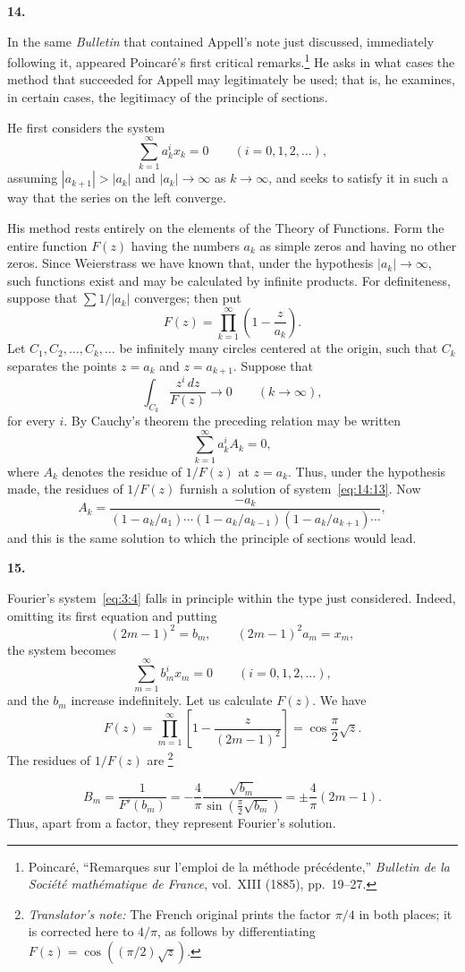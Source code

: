 \documentclass[
  paper=b5,
  fontsize=13pt,
  twoside=true,
  open=any,
  bookmarkpackage=false,
  chapterprefix=true,
  headings=normal
]{scrbook}
\theoremstyle{definition}
\newcommand{\numberedparagraph}[1]{%
  \par\medskip\phantomsection\label{sec:#1}%
  \noindent\textbf{#1.}\enspace
}
\newcounter{translatornote}
\newcommand{\translatornotelabel}{T\arabic{translatornote}}
\newcommand{\translatornote}[1]{%
  \stepcounter{translatornote}%
  \begingroup
    \edef\savedfootnotenumber{\number\value{footnote}}%
    \renewcommand{\thefootnote}{\translatornotelabel}%
    \footnote{\emph{Translator's note:} #1}%
    \setcounter{footnote}{\savedfootnotenumber}%
  \endgroup
}
\begin{document}
\numberedparagraph{14}
In the same \emph{Bulletin} that contained Appell's note just discussed, immediately following it, appeared Poincar\'e's first critical remarks.\footnote{Poincar\'e, ``Remarques sur l'emploi de la m\'ethode pr\'ec\'edente,'' \emph{Bulletin de la Soci\'et\'e math\'ematique de France}, vol.~XIII (1885), pp.~19--27.} He asks in what cases the method that succeeded for Appell may legitimately be used; that is, he examines, in certain cases, the legitimacy of the principle of sections.

He first considers the system
\begin{equation}
  \sum_{k=1}^{\infty}a_k^i x_k=0
  \qquad(i=0,1,2,\ldots),
  \tag{13}\label{eq:14:13}
\end{equation}
assuming $|a_{k+1}|>|a_k|$ and $|a_k|\to\infty$ as $k\to\infty$, and seeks to satisfy it in such a way that the series on the left converge.

His method rests entirely on the elements of the Theory of Functions. Form the entire function $F(z)$ having the numbers $a_k$ as simple zeros and having no other zeros. Since Weierstrass we have known that, under the hypothesis $|a_k|\to\infty$, such functions exist and may be calculated by infinite products. For definiteness, suppose that $\sum1/|a_k|$ converges; then put
\[
 F(z)=\prod_{k=1}^{\infty}\left(1-\frac z{a_k}\right).
\]
Let $C_1,C_2,\ldots,C_k,\ldots$ be infinitely many circles centered at the origin, such that $C_k$ separates the points $z=a_k$
and $z=a_{k+1}$. Suppose that
\begin{equation}
  \int_{C_k}\frac{z^i\,dz}{F(z)}\longrightarrow0
  \qquad(k\to\infty),
  \tag{14}\label{eq:14:14}
\end{equation}
for every $i$. By Cauchy's theorem the preceding relation may be written
\[
  \sum_{k=1}^{\infty}a_k^i A_k=0,
\]
where $A_k$ denotes the residue of $1/F(z)$ at $z=a_k$. Thus, under the hypothesis made, the residues of $1/F(z)$ furnish a solution of system~\eqref{eq:14:13}. Now
\[
 A_k=\frac{-a_k}
 {(1-a_k/a_1)\cdots(1-a_k/a_{k-1})(1-a_k/a_{k+1})\cdots},
\]
and this is the same solution to which the principle of sections would lead.

\numberedparagraph{15}
Fourier's system~\eqref{eq:3:4} falls in principle within the type just considered. Indeed, omitting its first equation and putting
\[
  (2m-1)^2=b_m,\qquad (2m-1)^2a_m=x_m,
\]
the system becomes
\[
  \sum_{m=1}^{\infty}b_m^i x_m=0
  \qquad(i=0,1,2,\ldots),
\]
and the $b_m$ increase indefinitely. Let us calculate $F(z)$. We have
\[
  F(z)=\prod_{m=1}^{\infty}\left[1-\frac z{(2m-1)^2}\right]
      =\cos\frac\pi2\sqrt z.
\]
The residues of $1/F(z)$ are\translatornote{The French original prints the factor $\pi/4$ in both places; it is corrected here to $4/\pi$, as follows by differentiating $F(z)=\cos((\pi/2)\sqrt z)$.}
\[
 B_m=\frac1{F'(b_m)}
 =-\frac4\pi\frac{\sqrt{b_m}}{\sin(\frac\pi2\sqrt{b_m})}
 =\pm\frac4\pi(2m-1).
\]
Thus, apart from a factor, they represent Fourier's solution.
\end{document}
